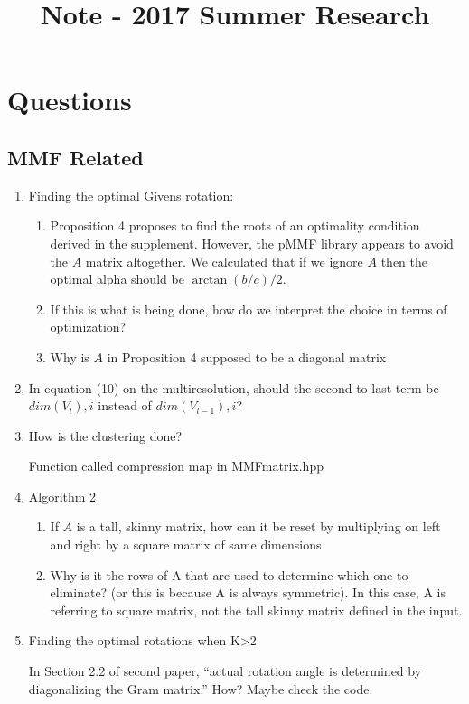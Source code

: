 \documentclass[a4paper]{article}
\title{Note - 2017 Summer Research}
\begin{document}
\maketitle

\tableofcontents

\newpage
\section{Questions}

\subsection{MMF Related}
\begin{enumerate}
\item Finding the optimal Givens rotation: 
\begin{enumerate}
\item Proposition 4 proposes to find the roots of an optimality condition derived in the supplement. However, the pMMF library appears to avoid the $A$ matrix altogether. We calculated that if we ignore $A$ then the optimal alpha should be $\arctan(b/c)/2$.
\item If this is what is being done, how do we interpret the choice in terms of optimization?
\item Why is $A$ in Proposition 4 supposed to be a diagonal matrix  
\end{enumerate}

\item In equation (10) on the multiresolution, should the second to last term be $dim(V_l),i$ instead of $dim(V_{l-1}),i$?
\item How is the clustering done?

Function called compression map in MMFmatrix.hpp
\item Algorithm 2
\begin{enumerate}

\item If $A$ is a tall, skinny matrix, how can it be reset by multiplying on left and right by a square matrix of same dimensions

\item Why is it the rows of A that are used to determine which one to eliminate? (or this is because A is always symmetric). In this case, A is referring to square matrix, not the tall skinny matrix defined in the input.
\end{enumerate}

\item Finding the optimal rotations when K>2

In Section 2.2 of second paper, ``actual rotation angle is determined by diagonalizing the Gram matrix.'' How? Maybe check the code.
\end{enumerate}
\end{document}

